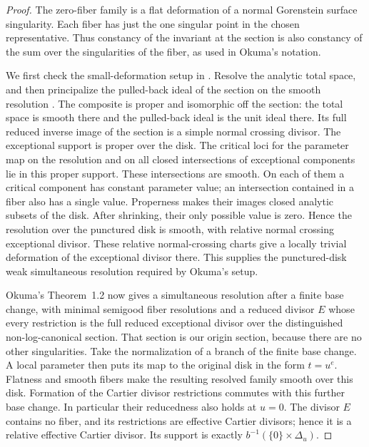\begin{proof}
The zero-fiber family is a flat deformation of a normal Gorenstein
surface singularity.  Each fiber has just the one singular point in the
chosen representative.  Thus constancy of the invariant at the section
is also constancy of the sum over the singularities of the fiber, as
used in Okuma's notation.

We first check the small-deformation setup in
\cite[Sections~3--4]{Okuma2004}.  Resolve the analytic total space, and
then principalize the pulled-back ideal of the section on the smooth
resolution \cite[Theorems~2.0.1 and~2.0.3, Lemma~4.0.3]{Wlodarczyk2009}.
The composite is proper and isomorphic off the section: the total space
is smooth there and the pulled-back ideal is the unit ideal there.
Its full reduced inverse image of the section is a simple normal crossing
divisor.  The exceptional support is proper over
the disk.  The critical loci for the parameter map on the resolution
and on all closed intersections of exceptional components lie in this
proper support.  These intersections are smooth.  On each of them a
critical component has constant parameter value; an intersection
contained in a fiber also has a single value.  Properness makes their
images closed analytic subsets of the disk.  After shrinking, their
only possible value is zero.  Hence the resolution over the punctured
disk is smooth, with relative normal crossing exceptional divisor.
These relative normal-crossing charts give a locally trivial deformation
of the exceptional divisor there.  This supplies the punctured-disk weak
simultaneous resolution required by Okuma's setup.

Okuma's Theorem~1.2 \cite{Okuma2004} now gives a simultaneous resolution
after a finite base change, with minimal semigood fiber resolutions and
a reduced divisor $E$ whose every restriction is the full reduced
exceptional divisor over the distinguished non-log-canonical section.
That section is our origin section, because there are no other
singularities.  Take the normalization of a branch of the finite base
change.  A local parameter then puts its map to the original disk in
the form $t=u^e$.  Flatness and smooth fibers make the resulting
resolved family smooth over this disk.  Formation of the Cartier
divisor restrictions commutes with this further base change.  In
particular their reducedness also holds at $u=0$.  The divisor $E$
contains no fiber, and its restrictions are effective Cartier
divisors; hence it is a relative effective Cartier divisor.  Its
support is exactly $b^{-1}(\{0\}\times\Delta_u)$.


\end{proof}
